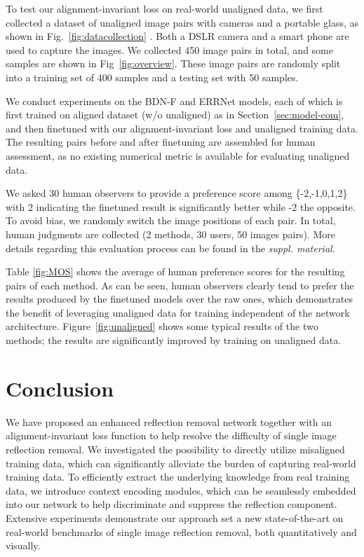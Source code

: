 \documentclass[10pt,twocolumn,letterpaper]{article}
\begin{document}
To test our alignment-invariant loss on real-world unaligned
data, we first collected a dataset of unaligned image pairs with cameras and a portable glass, as shown in Fig.~\ref{fig:datacollection} . Both a DSLR camera and a smart phone are used to capture the images. We collected 450 image pairs in total, and some samples are shown in Fig~\ref{fig:overview}. These image pairs are randomly split into a training set of 400 samples and a testing set with 50 samples.

We conduct experiments on the BDN-F and ERRNet models, each of which is first trained on aligned dataset (w/o unaligned) as in Section~\ref{sec:model-com}, and then finetuned with our alignment-invariant loss and unaligned training data. The resulting pairs before and after finetuning are assembled for human assessment, as no existing numerical metric is available for evaluating unaligned data.

We asked 30 human observers to provide a preference score among \{-2,-1,0,1,2\} with 2 indicating the finetuned result is significantly better while -2 the opposite. To avoid bias, we randomly switch the image positions of each pair. In total,  human judgments are collected (2 methods, 30 users, 50 images pairs). More details regarding this evaluation process can be found in the \emph{suppl. material}.

Table \ref{fig:MOS} shows the average of human preference scores for the  resulting pairs of each method. As can be seen, human observers clearly tend to prefer the results produced by the finetuned models over the raw ones, which demonstrates the benefit of leveraging unaligned data for training independent of the network architecture.
Figure~\ref{fig:unaligned} shows some typical results of the two methods; the results are significantly improved by training on unaligned data.

\section{Conclusion}
We have proposed an enhanced reflection removal network together with an alignment-invariant loss function to help resolve the difficulty of single image reflection removal. We investigated the possibility to directly utilize misaligned training data, which can significantly alleviate the burden of capturing real-world training data. To efficiently extract the underlying knowledge from real training data, we introduce context encoding modules, which can be seamlessly embedded into our network to help discriminate and suppress the reflection component. Extensive experiments demonstrate our approach set a new state-of-the-art on real-world benchmarks of single image reflection removal, both quantitatively and visually. 
\end{document}
